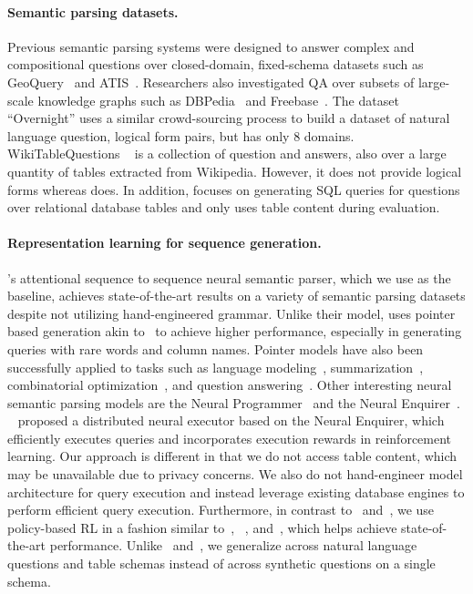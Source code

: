\documentclass{article} %
\begin{document}
\vspace{-2mm}
\paragraph{Semantic parsing datasets.}
Previous semantic parsing systems were designed to answer complex and compositional questions over closed-domain, fixed-schema datasets such as GeoQuery~\citep{Tang2001UsingMC} and ATIS~\citep{Price1990ATIS}.
Researchers also investigated QA over subsets of large-scale knowledge graphs such as DBPedia~\citep{Starc2017JointLO} and Freebase~\citep{cai2013LargescaleSP,berant2013SemanticPO}.
The dataset ``Overnight'' \citep{Wang2015BuildingAS} uses a similar crowd-sourcing process to build a dataset of natural language question, logical form pairs, but has only 8 domains.
WikiTableQuestions ~\citep{Pasupat2015CompositionalSP} is a collection of question and answers, also over a large quantity of tables extracted from Wikipedia.
However, it does not provide logical forms whereas \dataset does.
In addition, \dataset focuses on generating SQL queries for questions over relational database tables and only uses table content during evaluation.

\vspace{-2mm}
\paragraph{Representation learning for sequence generation.}
\citet{dong-neural_semantic_parsing}'s attentional sequence to sequence neural semantic parser, which we use as the baseline, achieves state-of-the-art results on a variety of semantic parsing datasets despite not utilizing hand-engineered grammar.
Unlike their model, \model uses pointer based generation akin to~\citet{vinyals-pointer_networks} to achieve higher performance, especially in generating queries with rare words and column names.
Pointer models have also been successfully applied to tasks such as language modeling~\citep{Merity2017}, summarization~\citep{gu-copying_in_seq2seq}, combinatorial optimization~\citep{bello-neural_combinatorial_optimization}, and question answering~\citep{seo-bidirectional_attention_flow,xiong-dynamic_coattention}.
Other interesting neural semantic parsing models are the Neural Programmer~\citep{neelakantan2016LearningAN} and the Neural Enquirer~\citep{YinLLK15}.
~\citet{mou2016coupling} proposed a distributed neural executor based on the Neural Enquirer, which efficiently executes queries and incorporates execution rewards in reinforcement learning.
Our approach is different in that we do not access table content, which may be unavailable due to privacy concerns.
We also do not hand-engineer model architecture for query execution and instead leverage existing database engines to perform efficient query execution.
Furthermore, in contrast to~\citet{dong-neural_semantic_parsing} and~\citet{neelakantan2016LearningAN}, we use policy-based RL in a fashion similar to~\citet{ChenNeuralSymbolic}, ~\citet{mou2016coupling}, and~\citet{GuuPLL17}, which helps \model achieve state-of-the-art performance.
Unlike~\citet{mou2016coupling} and~\citet{YinLLK15}, we generalize across natural language questions and table schemas instead of across synthetic questions on a single schema.
\end{document}
